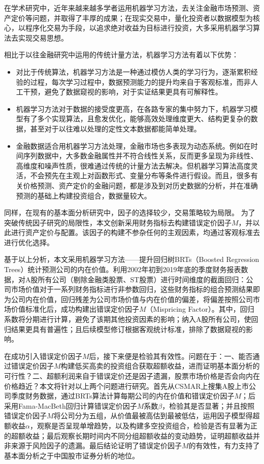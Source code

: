 在学术研究中，近年来越来越多学者运用机器学习方法，去关注金融市场预测、资产定价等问题，并取得了丰厚的成果；在现实交易中，量化投资者以数据模型为核心，以程序化交易为手段，以追求绝对收益为目标进行投资，大多采用机器学习算法去实现交易思想。

相比于以往金融研究中运用的传统计量方法，机器学习方法有着以下优势：
\begin{itemize}
\item 对比于传统算法，机器学习方法是一种通过模仿人类的学习行为，逐渐累积经验的过程，每次学习过程中，数据预测能力的提升均来自于客观标准，而非人工干预，避免了数据窥视的影响，对于实证结果更具有可解释性。
\item 机器学习方法对于数据的接受度更高，在各路专家的集中努力下，机器学习模型有了多个实现算法，且愈发优化，能够高效处理维度更大、结构更复杂的数据，甚至对于以往难以处理的定性文本数据都能简单处理。
\item 金融数据适合用机器学习方法处理，金融市场也多表现为动态系统。例如在时间序列数据中，大多数金融属性并不符合线性关系，反而更多呈现为非线性、高维度和噪声性质，很难通过传统的计量方法去解决\cite{zhaoJiQiXueXiZaiJinRongZiChanJieGeYuCeHePeiZhiZhongDeYingYongYanJiuShuPing2020}。但机器学习算法高度灵活，不会预先在主观上对函数形式、变量分布等条件进行假设。而且，很多有关价格预测、资产定价的金融问题，都是涉及到对历史数据的分析，并在准确预测的基础上构建投资组合，数据量较大。
\end{itemize}

同样，在现有的基本面分析研究中，因子的选择较少，交易策略较为局限。
为了突破传统因子研究的局限性，本文创新采用财务指标去构建错误定价因子$M$，并以此进行资产定价与配置。该因子的构建不参杂任何的主观因素，均通过客观标准去进行优化选择。

基于以上分析，本文采用机器学习方法——提升回归树BRTs（Boosted Regression Trees）统计预测公司的内在价值。利用2002年初到2019年底的季度财务报表数据，对A股所有公司（剔除金融类股票、ST股票）进行时间维度的截面回归：公司市场价值对于一系列财务指标进行非参数回归，这些财务指标的组合预测结果即为公司内在价值，回归残差为公司市场价值与内在价值的偏差，将偏差按照公司市场价值标准化后，成功构建出错误定价因子$M$（Mispricing Factor）。其中，回归系数将分期进行计算，避免了该期其他投资因素的影响；纳入A股所有公司，使回归结果更具有普遍性；且后续模型修订根据客观统计标准，排除了数据窥视的影响。

在成功引入错误定价因子$M$后，接下来便是检验其有效性。问题在于：一、能否通过错误定价因子$M$构建低买高卖的投资组合获取超额收益，进而证明基本面分析的可行性？二、超额利润来自于错误定价还是因子遗漏，股票市场价格是否会向内在价格趋近？本文将针对以上两个问题进行研究。首先从CSMAR上搜集A股上市公司季度财务数据，通过BRTs算法计算每期公司的内在价值和错误定价因子$M$；后采用Fama-MacBeth回归计算错误定价因子$M$系数$\beta$，检验其是否显著；并且按照错误定价因子$M$将公司分为五组，从价值最被高估到最被低估，运用因子模型得超额收益$\alpha$，观察是否呈现单增趋势，以及构建多空投资组合，检验是否有显著为正的超额收益；最后观察长期时间内不同分组超额收益的变动趋势，证明超额收益并非来源于风险因子的遗漏。最后结论证明了错误定价因子$M$的有效性，有力支持了基本面分析之于中国股市证券分析的地位。

